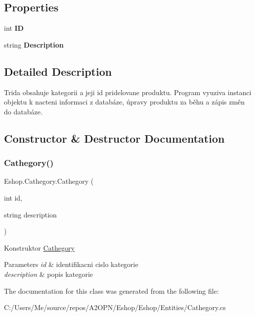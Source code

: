 \subsection*{Properties}
\begin{DoxyCompactItemize}
\item 
\mbox{\label{class_eshop_1_1_cathegory_ac97168a3082e0b03c9bc1a265a86f395}} 
int {\bfseries ID}
\item 
\mbox{\label{class_eshop_1_1_cathegory_a99bce234dfc04371e0819d1d5500ef30}} 
string {\bfseries Description}
\end{DoxyCompactItemize}


\subsection{Detailed Description}
Trida obsahuje kategorii a jeji id pridelovane produktu. Program vyuziva instanci objektu k nacteni informaci z databáze, úpravy produktu za běhu a zápis změn do databáze. 



\subsection{Constructor \& Destructor Documentation}
\mbox{\label{class_eshop_1_1_cathegory_a7902b675f8900a7e1ce986e439e46ddb}} 
\subsubsection{\texorpdfstring{Cathegory()}{Cathegory()}}
{\footnotesize\ttfamily Eshop.\+Cathegory.\+Cathegory (\begin{DoxyParamCaption}\item[{int}]{id,  }\item[{string}]{description }\end{DoxyParamCaption})}



Konstruktor \mbox{\hyperlink{class_eshop_1_1_cathegory}{Cathegory}} 


\begin{DoxyParams}{Parameters}
{\em id} & identifikacni cislo kategorie\\
\hline
{\em description} & popis kategorie\\
\hline
\end{DoxyParams}


The documentation for this class was generated from the following file\+:\begin{DoxyCompactItemize}
\item 
C\+:/\+Users/\+Me/source/repos/\+A2\+O\+P\+N/\+Eshop/\+Eshop/\+Entities/Cathegory.\+cs\end{DoxyCompactItemize}

